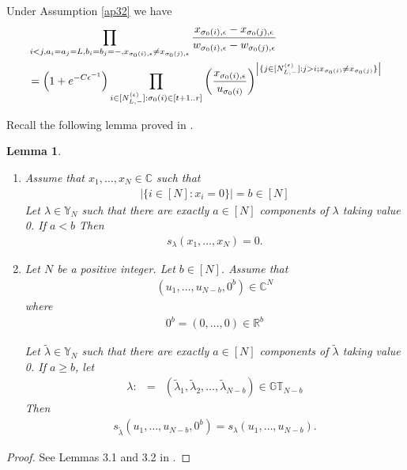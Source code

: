 \documentclass[11pt]{amsart}
\theoremstyle{plain}
\newtheorem{lemma}[theorem]{Lemma}
\theoremstyle{definition}
\theoremstyle{remark}
\newcommand\RR{{\mathbb R}}
\newcommand\si{\sigma}
\newcommand\GT{\mathbb{G}\mathbb{T}}
\newcommand\CC{\mathbb{C}}
\newcommand\YY{\mathbb{Y}}
\numberwithin{equation}{section}
\numberwithin{theorem}{section}
\numberwithin{figure}{section}
\begin{document}
Under Assumption \ref{ap32} we have
\begin{align}
&\prod_{i<j,a_i=a_j=L,b_i=b_j=-,x_{\si_0(i),\epsilon}\neq x_{\si_0(j),\epsilon}}\frac{x_{\si_0(i),\epsilon}-x_{\si_0(j),\epsilon}}{w_{\si_0(i),\epsilon}-w_{\si_0(j),\epsilon}}\label{pf1}\\
&=\left(1+e^{-C{\epsilon^{-1}}}\right)\prod_{i\in [N_{L,-}^{(\epsilon)}]:\sigma_0(i)\in[t+1..r]}\left(\frac{x_{\si_0(i),\epsilon}}{u_{\si_0(i)}}\right)^{\left|\{j\in [N_{L,-}^{(\epsilon)}]:j>i;x_{\si_0(i)}\neq x_{\si_0(j)}\}\right|}\notag
\end{align}

Recall the following lemma proved in \cite{zl202}.
\begin{lemma}\label{l212}
\begin{enumerate}
\item Assume that $x_1,\ldots,x_N\in \CC$ such that
\begin{eqnarray}
|\{i\in [N]: x_i=0\}|=b\in [N]\label{bz}
\end{eqnarray}
Let $\lambda\in \YY_N$ such that there are exactly $a \in[N]$ components of $\lambda$ taking value 0. If $a<b$
 Then
\begin{eqnarray}
s_{\lambda}(x_1,\ldots,x_N)=0.\label{shz}
\end{eqnarray}
\item Let $N$ be a positive integer. Let $b\in[N]$. Assume that 
\begin{eqnarray*}
(u_1,\ldots,u_{N-b},0^{b})\in \CC^N
\end{eqnarray*}
where 
\begin{eqnarray*}
0^{b}=(0,\ldots,0)\in \RR^{b}
\end{eqnarray*}


Let $\tilde{\lambda}\in \YY_N$ such that there are exactly $a \in[N]$ components of $\tilde{\lambda}$ taking value 0.
If $a\geq b$, let 
\begin{eqnarray}
\lambda:&=&(\tilde{\lambda}_1,\tilde{\lambda}_2,\ldots,\tilde{\lambda}_{N-b})\in \GT_{N-b}\label{dtl}
\end{eqnarray}
 Then
\begin{eqnarray*}
s_{\tilde{\lambda}}(u_1,\ldots,u_{N-b},0^b)=s_{\lambda}(u_1,\ldots,u_{N-b}).
\end{eqnarray*}
\end{enumerate}
\end{lemma}
\begin{proof}See Lemmas 3.1 and 3.2 in \cite{zl202}.
\end{proof}
\end{document}
